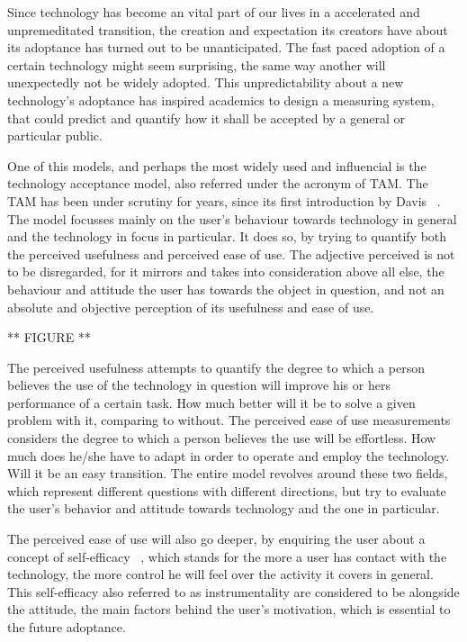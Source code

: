 Since technology has become an vital part of our lives in a accelerated and 
unpremeditated transition, the creation and expectation its creators have about its
adoptance has turned out to be unanticipated. The fast paced adoption of a certain
technology might seem surprising, the same way another will unexpectedly not be 
widely adopted. This unpredictability about a new technology's adoptance has inspired
academics to design a measuring system, that could predict and quantify how it 
shall be accepted by a general or particular public.

One of this models, and perhaps the most widely used and influencial is the 
technology acceptance model, also referred under the acronym of TAM.
The TAM has been under scrutiny for years, since its first introduction by Davis
~\cite{davis_1986}.
The model focusses mainly on the user's behaviour towards technology in general and
the technology in focus in particular. It does so, by trying to quantify both the
perceived usefulness and perceived ease of use. The adjective perceived is not to 
be disregarded, for it mirrors and takes into consideration above all else, the 
behaviour and attitude the user has towards the object in question, and not an
absolute and objective perception of its usefulness and ease of use.

** FIGURE **

The perceived usefulness attempts to quantify the degree to which a person believes
the use of the technology in question will improve his or hers performance of a 
certain task. How much better will it be to solve a given problem with it, comparing
to without.
The perceived ease of use measurements considers the degree to which a person 
believes the use will be effortless. How much does he/she have to adapt in order 
to operate and employ the technology. Will it be an easy transition.
The entire model revolves around these two fields, which represent different questions
with different directions, but try to evaluate the user's behavior and attitude
towards technology and the one in particular.

The perceived ease of use will also go deeper, by enquiring the user about a 
concept of self-efficacy ~\cite{lepper_1985}, which stands for the more a user has
contact with the technology, the more control he will feel over the activity it 
covers in general. This self-efficacy also referred to as instrumentality are 
considered to be alongside the attitude, the main factors behind the user's 
motivation, which is essential to the future adoptance.


